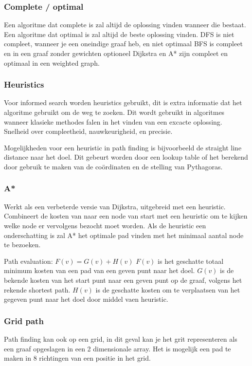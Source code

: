 \subsubsection{Complete / optimal}
Een algoritme dat complete is zal altijd de oplossing vinden wanneer die bestaat.
Een algoritme dat optimal is zal altijd de beste oplossing vinden.
DFS is niet compleet, wanneer je een oneindige graaf heb, en niet optimaal
BFS is compleet en in een graaf zonder gewichten optioneel
Dijkstra en A* zijn compleet en optimaal in een weighted graph.

\subsubsection{Heuristics}
Voor informed search worden heuristics gebruikt, dit is extra informatie dat het algoritme gebruikt om de weg te zoeken.
Dit wordt gebruikt in algoritmes wanneer klasieke methodes falen in het vinden van een excacte oplossing.
Snelheid over compleetheid, nauwkeurigheid, en precisie.

Mogelijkheden voor een heuristic in path finding is bijvoorbeeld de straight line distance naar het doel.
Dit gebeurt worden door een lookup table of het berekend door gebruik te maken van de coördinaten en de stelling van Pythagoras.

\subsubsection{A*}
Werkt als een verbeterde versie van Dijkstra, uitgebreid met een heuristic.
Combineert de kosten van naar een node van start met een heuristic om te kijken welke node er vervolgens bezocht moet worden.
Als de heuristic een onderschatting is zal A* het optimale pad vinden met het minimaal aantal node te bezoeken.

Path evaluation:
$F(v) = G(v) + H(v)$
$F(v)$ is het geschatte totaal minimum kosten van een pad van een geven punt naar het doel.
$G(v)$ is de bekende kosten van het start punt naar een geven punt op de graaf, volgens het rekende shortest path.
$H(v)$ is de geschatte kosten om te verplaatsen van het gegeven punt naar het doel door middel vaen heuristic.

\subsubsection{Grid path}
Path finding kan ook op een grid, in dit geval kan je het grit representeren als een graaf opgeslagen in een 2 dimensionale array.
Het is mogelijk een pad te maken in 8 richtingen van een positie in het grid.
